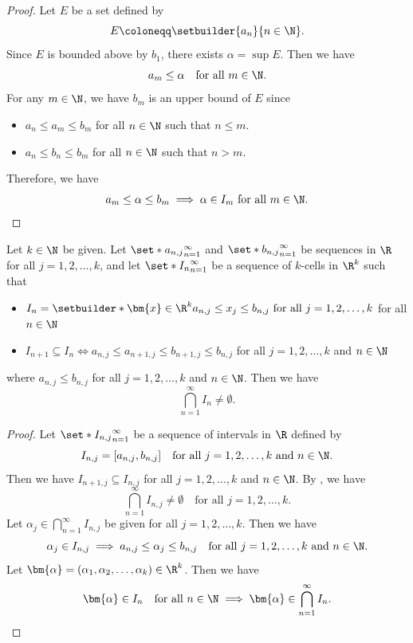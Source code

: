 \begin{proof}
    Let $E$ be a set defined by
    \[
    E \coloneqq \setbuilder{a_{n}}{n \in \N}.
    \]
    Since $E$ is bounded above by $b_{1}$, there exists $\alpha = \sup E$. Then we have
    \[
    a_{m} \leq \alpha \quad \text{for all } m \in \N.
    \]
    For any $m \in \N$, we have $b_{m}$ is an upper bound of $E$ since
    \begin{itemize}
        \item $a_{n} \leq a_{m} \leq b_{m}$ for all $n \in \N$ such that $n \leq m$.
        \item $a_{n} \leq b_{n} \leq b_{m}$ for all $n \in \N$ such that $n > m$.
    \end{itemize}
    Therefore, we have
    \[
    a_{m} \leq \alpha \leq b_{m} \implies \alpha \in I_{m} \text{ for all } m \in \N.
    \]
\end{proof}

\bigskip

\begin{theorem} \label{thm:NestedKCells}
    Let $k \in \N$ be given. Let $\set*{a_{n, j}}_{n = 1}^{\infty}$ and $\set*{b_{n, j}}_{n = 1}^{\infty}$ be sequences
    in $\R$ for all $j = 1, 2, \dots, k$, and let $\set*{I_{n}}_{n = 1}^{\infty}$ be a sequence of $k$-cells in $\R^{k}$
    such that
    \begin{itemize}
        \item $I_{n} = \setbuilder*{\bm{x} \in \R^{k}}{a_{n, j} \leq x_{j} \leq b_{n, j}
        \text{ for all } j = 1, 2, \dots, k}$ for all $n \in \N$
        \item $I_{n + 1} \subseteq I_{n} \iff a_{n, j} \leq a_{n + 1, j} \leq b_{n + 1, j} \leq b_{n, j}$
        for all $j = 1, 2, \dots, k$ and $n \in \N$
    \end{itemize}
    where $a_{n, j} \leq b_{n, j}$ for all $j = 1, 2, \dots, k$ and $n \in \N$. Then we have
    \[
    \bigcap_{n = 1}^{\infty} I_{n} \neq \emptyset.
    \]
\end{theorem}

\begin{proof}
    Let $\set*{I_{n, j}}_{n = 1}^{\infty}$ be a sequence of intervals in $\R$ defined by
    \[
    I_{n, j} = [a_{n, j}, b_{n, j}] \quad \text{for all } j = 1, 2, \dots, k \text{ and } n \in \N.
    \]
    Then we have $I_{n + 1, j} \subseteq I_{n, j}$ for all $j = 1, 2, \dots, k$
    and $n \in \N$. By , we have
    \[
    \bigcap_{n = 1}^{\infty} I_{n, j} \neq \emptyset \quad \text{for all } j = 1, 2, \dots, k.
    \]
    Let $\alpha_{j} \in \displaystyle \bigcap_{n = 1}^{\infty} I_{n, j}$ be given for all $j = 1, 2, \dots, k$. Then we have
    \[
    \alpha_{j} \in I_{n, j} \implies a_{n, j} \leq \alpha_{j} \leq b_{n, j} \quad \text{for all }
    j = 1, 2, \dots, k \text{ and } n \in \N.
    \]
    Let $\bm{\alpha} = (\alpha_{1}, \alpha_{2}, \dots, \alpha_{k}) \in \R^{k}$. Then we have
    \[
    \bm{\alpha} \in I_{n} \quad \text{for all } n \in \N \implies \bm{\alpha} \in \bigcap_{n = 1}^{\infty} I_{n}.
    \]
\end{proof}

